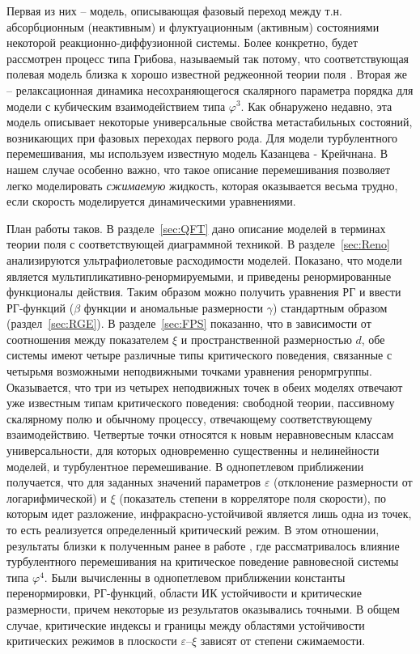\documentclass[a4paper,10pt]{article}
\begin{document}
 Первая из них -- модель,
описывающая фазовый переход между т.н. абсорбционным (неактивным)
и флуктуационным (активным) состояниями некоторой реакционно-диффузионной
системы. Более конкретно, будет рассмотрен процесс типа Грибова,
называемый так потому,
что соответствующая полевая модель близка к хорошо известной
реджеонной теории поля \cite{Zinn}. Вторая же -- релаксационная динамика
несохраняющегося скалярного параметра порядка для модели с кубическим
взаимодействием типа $\varphi^{3}$. Как обнаружено недавно, эта модель
описывает некоторые
универсальные свойства метастабильных состояний, возникающих при
фазовых переходах первого рода.
Для модели турбулентного перемешивания, мы используем известную модель Казанцева - Крейчнана.
В нашем случае особенно важно, что такое описание перемешивания
позволяет легко моделировать { \it сжимаемую} жидкость, которая оказывается весьма трудно,
 если скорость моделируется динамическими уравнениями.


План работы таков.  В разделе~\ref{sec:QFT} дано описание моделей в терминах
теории поля с соответствующей диаграммной техникой. В разделе~\ref{sec:Reno}
анализируются ультрафиолетовые расходимости моделей. Показано, что
модели является мультипликативно-ренормируемыми, и приведены
ренормированные функционалы действия. Таким образом можно получить уравнения
 РГ и ввести РГ-функций ($\beta$  функции и аномальные размерности $\gamma$) стандартным образом (раздел~\ref{sec:RGE}).
В разделе~\ref{sec:FPS} показанно, что в зависимости от соотношения между показателем $\xi$ и пространственной размерностью  $d$, обе системы 
имеют четыре различные типы критического поведения, связанные с четырьмя возможными неподвижными точками 
уравнения ренормгруппы.
Оказывается, что три из четырех неподвижных точек в обеих моделях отвечают
уже известным типам критического поведения: свободной теории, пассивному
скалярному полю и обычному процессу, отвечающему соответствующему
взаимодействию. Четвертые точки относятся к новым неравновесным классам
универсальности, для которых одновременно существенны и нелинейности моделей,
и турбулентное перемешивание. В однопетлевом приближении получается, что
для заданных значений параметров $\varepsilon$ (отклонение размерности от
логарифмической) и $\xi$ (показатель степени в корреляторе поля скорости),
по которым идет разложение, инфракрасно-устойчивой является лишь одна из
точек, то есть реализуется определенный критический режим. В этом отношении,
результаты близки к полученным ранее в работе \cite{Alexa}, где рассматривалось
влияние турбулентного перемешивания на критическое поведение равновесной
системы типа $\varphi^{4}$. 
Были вычисленны в однопетлевом приближении константы перенормировки, РГ-функций, области ИК устойчивости
 и критические размерности, причем некоторые 
из результатов оказывались точными.
В общем случае, критические индексы и границы между областями устойчивости критических режимов в плоскости $\varepsilon$--$\xi$ 
 зависят от степени сжимаемости.
\end{document}
